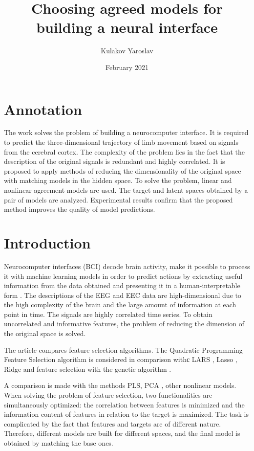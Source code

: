 \documentclass{article}
\title{Choosing agreed models for building a neural interface}
\author{Kulakov Yaroslav}
\date{February 2021}
\begin{document}
\maketitle




\section{Annotation}
The work solves the problem of building a neurocomputer interface. It is required to predict the three-dimensional trajectory of limb movement based on signals from the cerebral cortex. The complexity of the problem lies in the fact that the description of the original signals is redundant and highly correlated. It is proposed to apply methods of reducing the dimensionality of the original space with matching models in the hidden space. To solve the problem, linear and nonlinear agreement models are used. The target and latent spaces obtained by a pair of models are analyzed. Experimental results confirm that the proposed method improves the quality of model predictions.

\section{Introduction}
Neurocomputer interfaces (BCI) decode brain activity, make it possible to process it with machine learning models in order to predict actions by extracting useful information from the data obtained and presenting it in a human-interpretable form \cite{general_purpose_1300799} \cite{BLANKERTZ20101303}. The descriptions of the EEG and EEC data are high-dimensional due to the high complexity of the brain and the large amount of information at each point in time. The signals are highly correlated time series. To obtain uncorrelated and informative features, the problem of reducing the dimension of the original space is solved.\cite{feature_selection_ecog} \cite{ATYABI2013319} \cite{7330455} \par

The article \cite{qpfs} compares feature selection algorithms. The Quadratic Programming Feature Selection \cite{qpfs} algorithm is considered in comparison withс LARS \cite{MICHE20112413}, Lasso \cite{zhao2007stagewise}, Ridge \cite{ridge} and feature selection with the genetic algorithm \cite{tan2008genetic}. \par
A comparison is made with the methods PLS, PCA\cite{abdi2003pls} \cite{wegelin2000survey}, other nonlinear models. When solving the problem of feature selection, two functionalities are simultaneously optimized: the correlation between features is minimized and the information content of features in relation to the target is maximized. The task is complicated by the fact that features and targets are of different nature. Therefore, different models are built for different spaces, and the final model is obtained by matching the base ones.
\end{document}
